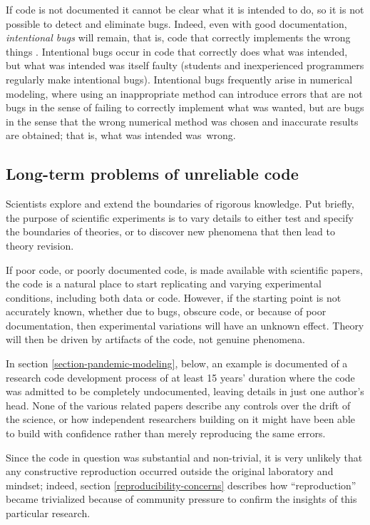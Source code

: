 \documentclass{comjnl}
\begin{document}
If code is not documented it cannot be clear what it is intended to do, so it is not possible to detect and eliminate bugs. Indeed, even with good documentation, \emph{intentional bugs\/} will remain, that is, code that correctly implements the wrong things \cite{essence-of-software,fixit}. Intentional bugs occur in code that correctly does what was intended, but what was intended was itself faulty (students and inexperienced programmers regularly make intentional bugs). Intentional bugs frequently arise in numerical modeling, where using an inappropriate method can introduce errors that are not bugs in the sense of failing to correctly implement what was wanted, but are bugs in the sense that the wrong numerical method was chosen and inaccurate results are obtained; that is, what was intended was~wrong. 

\subsection{Long-term problems of unreliable code}
Scientists explore and extend the boundaries of rigorous knowledge. Put briefly, the purpose of scientific experiments is to vary details to either test and specify the boundaries of theories, or to discover new phenomena that then lead to theory revision. 

If poor code, or poorly documented code, is made available with scientific papers, the code is a natural place to start replicating and varying experimental conditions, including both data or code. However, if the starting point is not accurately known, whether due to bugs, obscure code, or because of poor documentation, then experimental variations will have an unknown effect. Theory will then be driven by artifacts of the code, not genuine phenomena. 

In section \ref{section-pandemic-modeling}, below, an example is documented of a research code development process of at least 15 years' duration where the code was admitted to be completely undocumented, leaving details in just one author's head. None of the various related papers describe any controls over the drift of the science, or how independent researchers building on it might have been able to build with confidence rather than merely reproducing the same errors. 

Since the code in question was substantial and non-trivial, it is very unlikely that any constructive reproduction occurred outside the original laboratory and mindset; indeed, section \ref{reproducibility-concerns} describes how ``reproduction'' became trivialized because of community pressure to confirm the insights of this particular research. 
\end{document}

